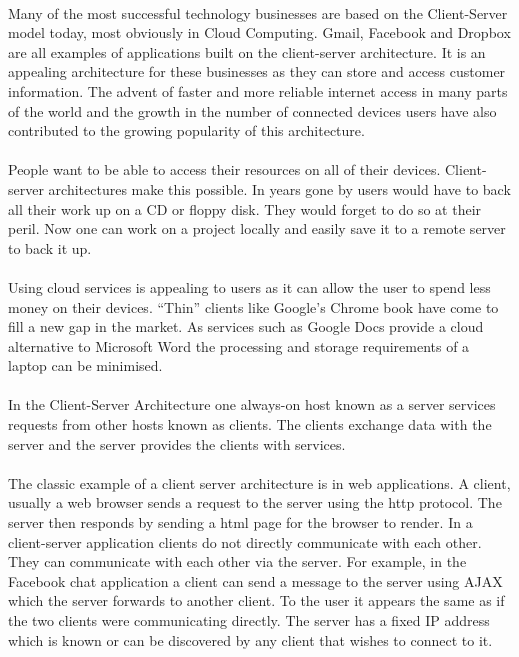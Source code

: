 \documentclass[11pt]{amsart}
\begin{document}
\paragraph{}
Many of the most successful technology businesses are based on the Client-Server model today, most obviously in Cloud Computing. Gmail, Facebook and Dropbox are all examples of applications built on the client-server architecture. It is an appealing architecture for these businesses as they can store and access customer information. The advent of faster and more reliable internet access in many parts of the world and the growth in the number of connected devices users have also contributed to the growing popularity of this architecture. 
\paragraph{}
People want to be able to access their resources on all of their devices. Client-server architectures make this possible. In years gone by users would have to back all their work up on a CD or floppy disk. They would forget to do so at their peril. Now one can work on a project locally and easily save it to a remote server to back it up. 
\paragraph{}
Using cloud services is appealing to users as it can allow the user to spend less money on their devices. ``Thin'' clients like Google's Chrome book have come to fill a new gap in the market. As services such as Google Docs provide a cloud alternative to Microsoft Word the processing and storage requirements of a laptop can be minimised.

\paragraph{}
In the Client-Server Architecture one always-on host known as a server services requests from other hosts known as clients. The clients exchange data with the server and the server provides the clients with services. 
\paragraph{}
The classic example of a client server architecture is in web applications. A client, usually a web browser sends a request to the server using the http protocol. The server then responds by sending a html page for the browser to render. In a client-server application clients do not directly communicate with each other. They can communicate with each other via the server. For example, in the Facebook chat application a client can send a message to the server using AJAX which the server forwards to another client. To the user it appears the same as if the two clients were communicating directly. The server has a fixed IP address which is known or can be discovered by any client that wishes to connect to it.
\end{document}
